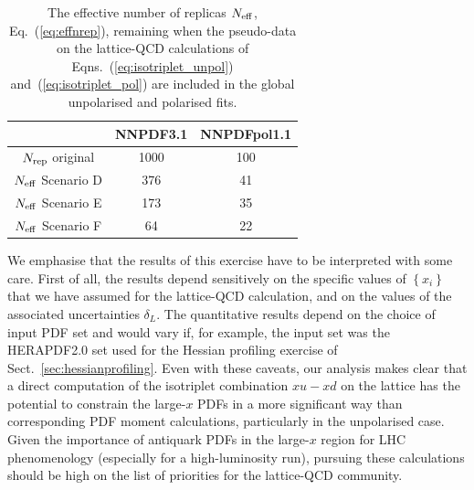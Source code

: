 \begin{table}[h!]
  \centering
  \renewcommand{\arraystretch}{1.3} 
  \begin{tabular}{c|c|c}
    \hline
    &  NNPDF3.1  &  NNPDFpol1.1 \\
    \hline
    \hline
    $N_{\rm rep}$ original   &   1000 &  100   \\
    \hline
     $N_{\rm eff}$ Scenario D    &   376  &  41   \\
     $N_{\rm eff}$ Scenario E    &   173   &   35  \\
     $N_{\rm eff}$ Scenario F   &   64  &   22  \\
    \hline
  \end{tabular}
  \caption{\small The effective number of replicas
    $N_{\rm eff}$, Eq.~(\ref{eq:effnrep}), remaining when the pseudo-data
    on the lattice-QCD calculations
    of Eqns.~(\ref{eq:isotriplet_unpol})
and~(\ref{eq:isotriplet_pol}) 
   are included in the global
    unpolarised and polarised fits. 
    \label{tab:neffxspace}
  }
\end{table}

We emphasise that
the results of this exercise have to be interpreted
with some care.
%
First of all, the results depend sensitively on the specific values of
$\left\{ x_i \right\}$
that we have assumed for the lattice-QCD calculation,
and on the values
of the associated uncertainties $\delta_L$.
%
The quantitative results depend on the choice of input PDF set and would 
vary if, for example, the input set was the HERAPDF2.0 set used for the 
Hessian profiling exercise of Sect.~\ref{sec:hessianprofiling}.
%
Even with these caveats, our analysis makes clear that a direct
computation of the isotriplet combination $x u-x d$ on the lattice
has the potential to constrain the large-$x$ PDFs in
a more significant way than corresponding PDF moment calculations,
particularly in the unpolarised case.
%
Given the importance of antiquark PDFs in the large-$x$ region for LHC phenomenology
(especially for a high-luminosity run), 
pursuing these calculations should be high on the list
of priorities for the lattice-QCD community.

